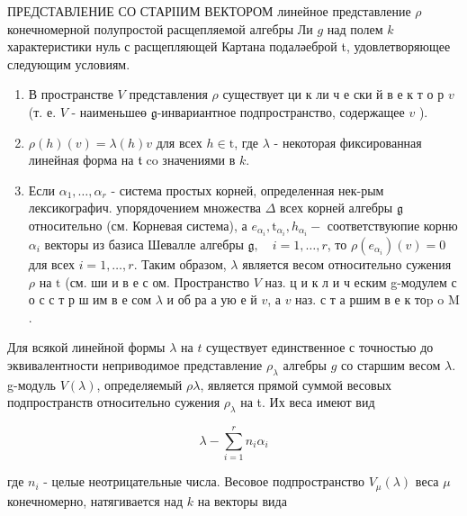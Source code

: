 \documentclass[10pt]{article}
\begin{document}
ПРЕДСТАВЛЕНИЕ СО СТАРІІИМ ВЕКТОРОМ линейное представление $\rho$ конечномерной полупростой расщепляемой алгебры Ли $g$ над полем $k$ характеристики нуль с расщепляющей Картана подаләеброй t, удовлетворяющее следующим условиям.



\begin{enumerate}

  \item В пространстве $V$ представления $\rho$ существует ци к ли ч е ски й в е к т о р $v$ (т. е. $V$ - наименьшеө $\mathfrak{g}$-инвариантное подпространство, содержащее $v$ ).



  \item $\rho(h)(v)=\lambda(h) v$ для всех $h \in \mathrm{t}$, где $\lambda$ - некоторая фиксированная линейная форма на $\mathfrak{t}$ co значениями в $k$.



  \item Если $\alpha_{1}, \ldots, \alpha_{r}$ - система простых корней, определенная нек-рым лексикографич. упорядочением множества $\Delta$ всех корней алгебры $\mathfrak{g}$ относительно (см. Корневая система), а $e_{\alpha_{i}}, \mathrm{t}_{\alpha_{i}}, h_{\alpha_{i}}-$ соответствуюпие корню $\alpha_{i}$ векторы из базиса Шевалле алгебры $\mathfrak{g}, \quad i=1, \ldots, r$, то $\rho\left(e_{\alpha_{i}}\right)(v)=0$ для всех $i=1, \ldots, r$. Таким образом, $\lambda$ является весом относительно сужения $\rho$ на $\mathrm{t}$ (см. ши и в е с ом. Пространство $V$ наз. ц и к л и ч еским g-модулем с о с с т р ш им в е сом $\lambda$ и об ра а ую е й $v$, а $v$ наз. с т а ршим в е к тоp o $\mathrm{M}$.



\end{enumerate}



Для всякой линейной формы $\lambda$ на $t$ существует единственное с точностью до эквивалентности неприводимое представление $\rho_{\lambda}$ алгебры $g$ со старшим весом $\lambda$. g-модуль $V(\lambda)$, определяемый $\rho \lambda$, является прямой суммой весовых подпространств относительно сужения $\rho_{\lambda}$ на t. Их веса имеют вид



\[

\lambda-\sum_{i=1}^{r} n_{i} \alpha_{i}

\]



где $n_{i}$ - целые неотрицательные числа. Весовое подпространство $V_{\mu}(\lambda)$ веса $\mu$ конечномерно, натягивается над $k$ на векторы вида
\end{document}
